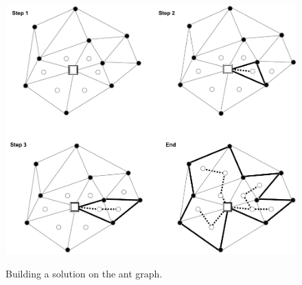 \begin{figure}[h]
	\begin{centering}
		{\includegraphics[width=\textwidth]{figures/background/aco_grid.pdf}}
		\caption{Building a solution on the ant graph.}
		\label{fig:aco_grid}
	\end{centering}
\end{figure}
